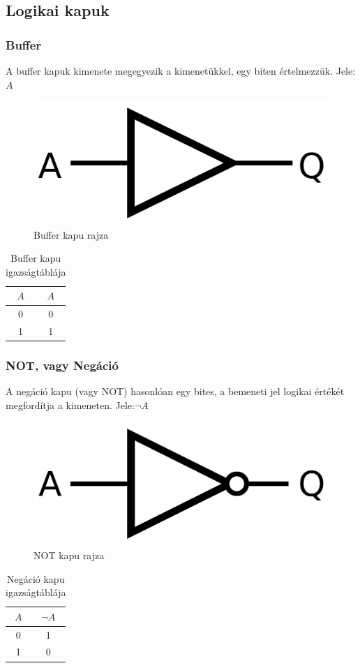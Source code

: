 \documentclass[
]{thesis-ekf}
\theoremstyle{definition}
\theoremstyle{remark}
\begin{document}
\subsection{Logikai kapuk}
\subsubsection{Buffer}
A buffer kapuk kimenete megegyezik a kimenetükkel, egy biten értelmezzük. Jele: $A$

\begin{figure}[H]
	\centering
	\includegraphics[width=0.3\linewidth]{buffer}
	\caption{Buffer kapu rajza}
	\label{fig:buffer}
\end{figure}


\begin{table}[H]
	\centering
	\begin{tabular}{c|c}
		$A$ & $A$\\
		\hline
		0 & 0\\
		1 & 1
	\end{tabular}
	\caption{Buffer kapu igazságtáblája}
\end{table}

\subsubsection{NOT, vagy Negáció}
A negáció kapu (vagy NOT) hasonlóan egy bites, a bemeneti jel logikai értékét megfordítja a kimeneten. Jele:$\neg A$

\begin{figure}[H]
	\centering
	\includegraphics[width=0.3\linewidth]{not}
	\caption{NOT kapu rajza}
	\label{fig:not}
\end{figure}


\begin{table}[H]
	\centering
	\begin{tabular}{c|c}
		$A$ & $\neg A$\\
		\hline
		0 & 1\\
		1 & 0 
	\end{tabular}
	\caption{Negáció kapu igazságtáblája}
\end{table}
\end{document}
